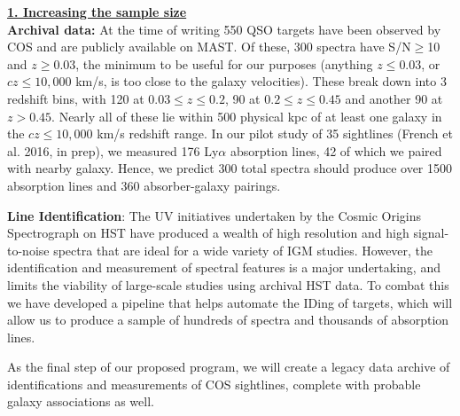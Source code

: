 \documentclass[12pt]{article}
\begin{document}
\noindent \textbf{\underline{1. Increasing the sample size}}\\

\textbf{Archival data:} At the time of writing 550 QSO targets have been observed by COS and are publicly available on MAST. Of these, 300 spectra have S/N$\geq$10 and $z \geq 0.03$, the minimum to be useful for our purposes (anything $z \leq 0.03$, or $cz \leq 10,000$ km/s, is too close to the galaxy velocities). These break down into 3 redshift bins, with 120 at $0.03\leq z \leq 0.2$, 90 at $0.2\leq z \leq 0.45$ and another 90 at $z > 0.45$. Nearly all of these lie within 500 physical kpc of at least one galaxy in the $cz \leq 10,000$ km/s redshift range. In our pilot study of 35 sightlines (French et al. 2016, in prep), we measured 176 Ly$\alpha$ absorption lines, 42 of which we paired with nearby galaxy. Hence, we predict 300 total spectra should produce over 1500 absorption lines and 360 absorber-galaxy pairings.

\textbf{Line Identification}: The UV initiatives undertaken by the Cosmic Origins Spectrograph on HST have produced a wealth of high resolution and high signal-to-noise spectra that are ideal for a wide variety of IGM studies. However, the identification and measurement of spectral features is a major undertaking, and limits the viability of large-scale studies using archival HST data. To combat this we have developed a pipeline that helps automate the IDing of targets, which will allow us to produce a sample of hundreds of spectra and thousands of absorption lines. 

As the final step of our proposed program, we will create a legacy data archive of identifications and measurements of COS sightlines, complete with probable galaxy associations as well.\\


%
\end{document}
